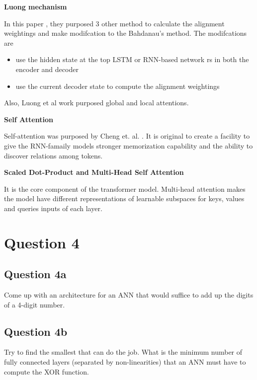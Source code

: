 \documentclass{kthreport}
\begin{document}
\textbf{Luong mechanism}

In this paper \cite{luong-etal-2015-effective}, they purposed 3 other method to calculate the alignment weightings
and make modifcation to the Bahdanau's method. The modifcations are
\begin{itemize}
    \item use the hidden state at the top LSTM or RNN-based network rs in both the encoder and decoder
    \item use the current decoder state to compute the alignment weightings
\end{itemize}

Also, Luong et al work \cite{luong-etal-2015-effective} purposed global and local attentions.

\textbf{Self Attention}

Self-attention was purposed by Cheng et. al. \cite{cheng-etal-2016-long}. It is
original to create a facility to give the RNN-famaily models stronger memorization
capability and the ability to discover relations among tokens.

\textbf{Scaled Dot-Product and Multi-Head Self Attention}

It is the core component of the transformer model. \cite{vaswani2017attention}
Multi-head attention makes the model have different representations of
learnable subspaces for keys, values and queries inputs of each layer.




\section{Question 4}
\subsection{Question 4a}
Come up with an architecture for an ANN that would suffice to add up the digits of a 4-digit number.

\subsection{Question 4b}
Try to find the smallest that can do the job.
What is the minimum number of fully connected layers (separated by non-linearities)
that an ANN must have to compute the XOR function.
\end{document}
